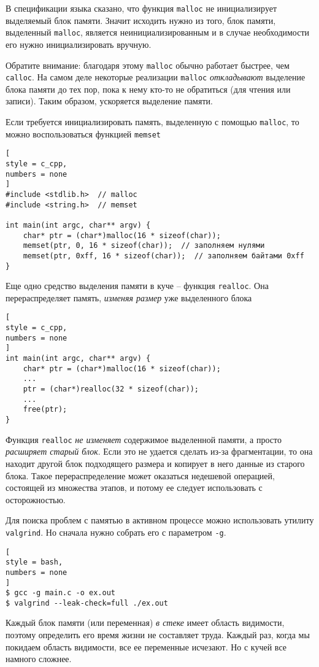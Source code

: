 \documentclass[%
	11pt,
	a4paper,
	utf8,
		]{article}
\begin{document}
В спецификации языка сказано, что функция \verb|malloc| не инициализирует выделяемый блок памяти. Значит исходить нужно из того, блок памяти, выделенный \verb|malloc|, является неинициализированным и в случае необходимости его нужно инициализировать вручную. 

Обратите внимание: благодаря этому \verb|malloc| обычно работает быстрее, чем \verb|calloc|. На самом деле некоторые реализации \verb|malloc| \emph{откладывают} выделение блока памяти до тех пор, пока к нему кто-то не обратиться (для чтения или записи). Таким образом, ускоряется выделение памяти.

Если требуется инициализировать память, выделенную с помощью \verb|malloc|, то можно воспользоваться функцией \verb*|memset|
\begin{lstlisting}[
style = c_cpp,
numbers = none
]
#include <stdlib.h>  // malloc
#include <string.h>  // memset

int main(int argc, char** argv) {
    char* ptr = (char*)malloc(16 * sizeof(char));
    memset(ptr, 0, 16 * sizeof(char));  // заполняем нулями
    memset(ptr, 0xff, 16 * sizeof(char));  // заполняем байтами 0xff
}
\end{lstlisting}

Еще одно средство выделения памяти в куче -- функция \verb|realloc|. Она перераспределяет память, \emph{изменяя размер} уже выделенного блока
\begin{lstlisting}[
style = c_cpp,
numbers = none
]
int main(int argc, char** argv) {
    char* ptr = (char*)malloc(16 * sizeof(char));
    ...
    ptr = (char*)realloc(32 * sizeof(char));
    ...
    free(ptr);
}
\end{lstlisting}

Функция \verb|realloc| \emph{не изменяет} содержимое выделенной памяти, а просто \emph{расширяет старый блок}. Если это не удается сделать из-за фрагментации, то она находит другой блок подходящего размера и копирует в него данные из старого блока. Такое перераспределение может оказаться недешевой операцией, состоящей из множества этапов, и потому ее следует использовать с осторожностью.

Для поиска проблем с памятью в активном процессе можно использовать утилиту \verb|valgrind|. Но сначала нужно собрать его с параметром \verb|-g|.
\begin{lstlisting}[
style = bash,
numbers = none
]
$ gcc -g main.c -o ex.out
$ valgrind --leak-check=full ./ex.out
\end{lstlisting}

Каждый блок памяти (или переменная) \emph{в стеке} имеет область видимости, поэтому определить его время жизни не составляет труда. Каждый раз, когда мы покидаем область видимости, все ее переменные исчезают. Но с кучей все намного сложнее.
\end{document}

